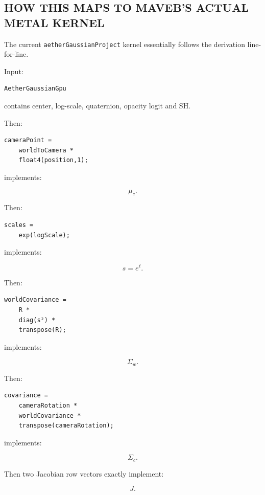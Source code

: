 \subsection{HOW THIS MAPS TO MAVEB'S ACTUAL METAL KERNEL}\label{04-visual-computing-ii-ch038-how-this-maps-to-mavebs-actual-metal-kernel}

The current \texttt{aetherGaussianProject} kernel essentially follows the derivation line-for-line.

Input:

\protect{}\label{pcn1vt}%
\begin{verbatim}
AetherGaussianGpu
\end{verbatim}

contains center, log-scale, quaternion, opacity logit and SH.

Then:

\protect{}\label{3sxvec}%
\begin{verbatim}
cameraPoint =
    worldToCamera *
    float4(position,1);
\end{verbatim}

implements:

\[
\mu_c.
\]

Then:

\protect{}\label{9a8s32}%
\begin{verbatim}
scales =
    exp(logScale);
\end{verbatim}

implements:

\[
s=e^\ell.
\]

Then:

\protect{}\label{d32mgd}%
\begin{verbatim}
worldCovariance =
    R *
    diag(s²) *
    transpose(R);
\end{verbatim}

implements:

\[
\Sigma_w.
\]

Then:

\protect{}\label{bwtx1c}%
\begin{verbatim}
covariance =
    cameraRotation *
    worldCovariance *
    transpose(cameraRotation);
\end{verbatim}

implements:

\[
\Sigma_c.
\]

Then two Jacobian row vectors exactly implement:

\[
J.
\]

